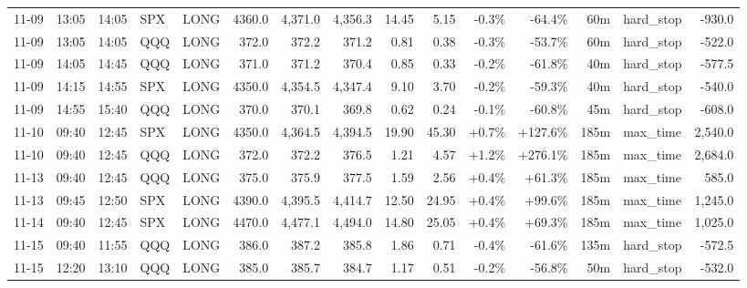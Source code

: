 \documentclass[11pt,a4paper,twoside]{article}
\begin{document}
\begin{landscape}
\begin{center}
\begin{longtable}{>{\color{txtmain}}l l l l l r r r r r r r r >{\color{txtmain}}l r}
11-09 & 13:05 & 14:05 & SPX & LONG & 4360.0 & 4,371.0 & 4,356.3 & 14.45 & 5.15 & \textcolor{lossred}{-0.3\%} & \textcolor{lossred}{-64.4\%} & 60m & hard\_stop & \textcolor{lossred}{-930.0} \\
11-09 & 13:05 & 14:05 & QQQ & LONG & 372.0 & 372.2 & 371.2 & 0.81 & 0.38 & \textcolor{lossred}{-0.3\%} & \textcolor{lossred}{-53.7\%} & 60m & hard\_stop & \textcolor{lossred}{-522.0} \\
11-09 & 14:05 & 14:45 & QQQ & LONG & 371.0 & 371.2 & 370.4 & 0.85 & 0.33 & \textcolor{lossred}{-0.2\%} & \textcolor{lossred}{-61.8\%} & 40m & hard\_stop & \textcolor{lossred}{-577.5} \\
11-09 & 14:15 & 14:55 & SPX & LONG & 4350.0 & 4,354.5 & 4,347.4 & 9.10 & 3.70 & \textcolor{lossred}{-0.2\%} & \textcolor{lossred}{-59.3\%} & 40m & hard\_stop & \textcolor{lossred}{-540.0} \\
11-09 & 14:55 & 15:40 & QQQ & LONG & 370.0 & 370.1 & 369.8 & 0.62 & 0.24 & \textcolor{lossred}{-0.1\%} & \textcolor{lossred}{-60.8\%} & 45m & hard\_stop & \textcolor{lossred}{-608.0} \\
11-10 & 09:40 & 12:45 & SPX & LONG & 4350.0 & 4,364.5 & 4,394.5 & 19.90 & 45.30 & \textcolor{wingreen}{+0.7\%} & \textcolor{wingreen}{+127.6\%} & 185m & max\_time & \textcolor{wingreen}{2,540.0} \\
11-10 & 09:40 & 12:45 & QQQ & LONG & 372.0 & 372.2 & 376.5 & 1.21 & 4.57 & \textcolor{wingreen}{+1.2\%} & \textcolor{wingreen}{+276.1\%} & 185m & max\_time & \textcolor{wingreen}{2,684.0} \\
11-13 & 09:40 & 12:45 & QQQ & LONG & 375.0 & 375.9 & 377.5 & 1.59 & 2.56 & \textcolor{wingreen}{+0.4\%} & \textcolor{wingreen}{+61.3\%} & 185m & max\_time & \textcolor{wingreen}{585.0} \\
11-13 & 09:45 & 12:50 & SPX & LONG & 4390.0 & 4,395.5 & 4,414.7 & 12.50 & 24.95 & \textcolor{wingreen}{+0.4\%} & \textcolor{wingreen}{+99.6\%} & 185m & max\_time & \textcolor{wingreen}{1,245.0} \\
11-14 & 09:40 & 12:45 & SPX & LONG & 4470.0 & 4,477.1 & 4,494.0 & 14.80 & 25.05 & \textcolor{wingreen}{+0.4\%} & \textcolor{wingreen}{+69.3\%} & 185m & max\_time & \textcolor{wingreen}{1,025.0} \\
11-15 & 09:40 & 11:55 & QQQ & LONG & 386.0 & 387.2 & 385.8 & 1.86 & 0.71 & \textcolor{lossred}{-0.4\%} & \textcolor{lossred}{-61.6\%} & 135m & hard\_stop & \textcolor{lossred}{-572.5} \\
11-15 & 12:20 & 13:10 & QQQ & LONG & 385.0 & 385.7 & 384.7 & 1.17 & 0.51 & \textcolor{lossred}{-0.2\%} & \textcolor{lossred}{-56.8\%} & 50m & hard\_stop & \textcolor{lossred}{-532.0} \\

\end{longtable}
\end{center}
\end{landscape}
\end{document}
